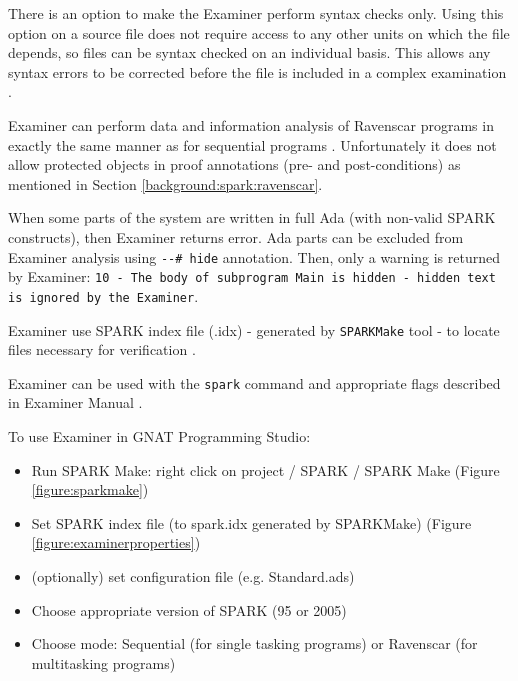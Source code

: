 There is an option to make the Examiner perform syntax checks only. Using this option on a source file does not require access to any other units on which the file depends, so files can be syntax checked on an individual basis. This allows any syntax errors to be corrected before the file is included in a complex examination \cite{Examiner:Online}.

Examiner can perform data and information analysis of Ravenscar programs in exactly the same manner as for sequential programs \cite{Ravenscar:Online}. Unfortunately it does not allow protected objects in proof annotations (pre- and post-conditions) as mentioned in Section \ref{background:spark:ravenscar}.

When some parts of the system are written in full Ada (with non-valid SPARK constructs), then Examiner returns error. Ada parts can be excluded from Examiner analysis using \lstinline{--# hide} annotation. Then, only a warning is returned by Examiner: \lstinline{10 - The body of subprogram Main is hidden - hidden text is ignored by the Examiner}.

Examiner use SPARK index file (.idx) - generated by \lstinline{SPARKMake} tool -  to locate files necessary for verification \cite{Barnes:Book}.

Examiner can be used with the \lstinline{spark} command and appropriate flags described in Examiner Manual \cite{Examiner:Online}.


To use Examiner in GNAT Programming Studio:
\begin{itemize}
	\item Run SPARK Make: right click on project / SPARK / SPARK Make (Figure \ref{figure:sparkmake})
	\item Set SPARK index file (to spark.idx generated by SPARKMake) (Figure \ref{figure:examinerproperties})
	\item (optionally) set configuration file (e.g. Standard.ads)
	\item Choose appropriate version of SPARK (95 or 2005)
	\item Choose mode: Sequential (for single tasking programs) or Ravenscar (for multitasking programs)
\end{itemize}

